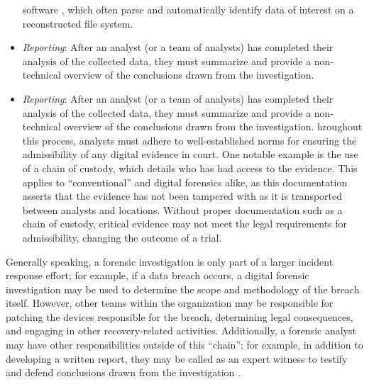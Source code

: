 \begin{itemize}
  software \cite{jonesInsightDigitalForensics2022}, which often
  parse and automatically identify data of interest on a reconstructed
  file system.
\item
  \emph{Reporting}: After an analyst (or a team of analysts) has
  completed their analysis of the collected data, they must summarize
  and provide a non-technical overview of the conclusions drawn from the
  investigation.
\item
  \emph{Reporting}: After an analyst (or a team of analysts) has
  completed their analysis of the collected data, they must summarize
  and provide a non-technical overview of the conclusions drawn from the
  investigation. hroughout this process, analysts must adhere to
  well-established norms for ensuring the admissibility of any digital
  evidence in court. One notable example is the use of a chain of
  custody, which details who has had access to the evidence. This
  applies to ``conventional'' and digital forensics alike, as this
  documentation asserts that the evidence has not been tampered with as
  it is transported between analysts and locations. Without proper
  documentation such as a chain of custody, critical evidence may not
  meet the legal requirements for admissibility, changing the outcome of
  a trial.
\end{itemize}

Generally speaking, a forensic investigation is only part of a larger
incident response effort; for example, if a data breach occurs, a
digital forensic investigation may be used to determine the scope and
methodology of the breach itself. However, other teams within the
organization may be responsible for patching the devices responsible for
the breach, determining legal consequences, and engaging in other
recovery-related activities. Additionally, a forensic analyst may have
other responsibilities outside of this ``chain''; for example, in
addition to developing a written report, they may be called as an expert
witness to testify and defend conclusions drawn from the investigation
\cite{andersonComparativeStudyTeaching2006,conklinComputerForensics2022,cooperStandardsDigitalForensics2010}.

